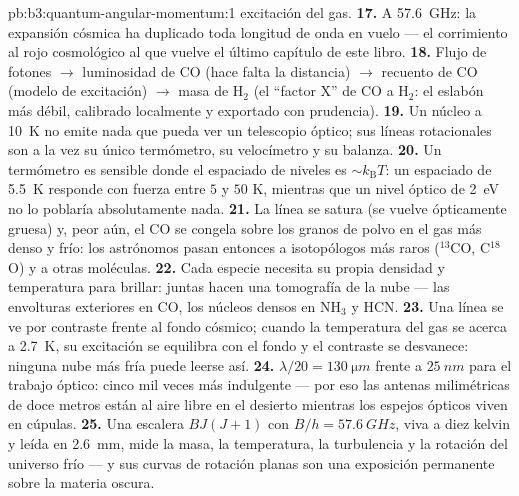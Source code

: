 \begin{solution}{pb:b3:quantum-angular-momentum:1}
excitación del gas.
\textbf{17.} A \qty{57.6}{GHz}: la expansión cósmica ha duplicado toda
longitud de onda en vuelo --- el corrimiento al rojo cosmológico al que
vuelve el último capítulo de este libro.
\textbf{18.} Flujo de fotones $\to$ luminosidad de CO (hace falta la
distancia) $\to$ recuento de CO (modelo de excitación) $\to$ masa de H$_2$
(el ``factor X'' de CO a H$_2$: el eslabón más débil, calibrado localmente
y exportado con prudencia).
\textbf{19.} Un núcleo a \qty{10}{K} no emite nada que pueda ver un
telescopio óptico; sus líneas rotacionales son a la vez su único
termómetro, su velocímetro y su balanza.
\textbf{20.} Un termómetro es sensible donde el espaciado de niveles es $\sim
k_{\text{B}}T$: un espaciado de \qty{5.5}{K} responde con fuerza
entre $5$ y $50$ K, mientras que un nivel óptico de \qty{2}{eV} no lo
poblaría absolutamente nada.
\textbf{21.} La línea se satura (se vuelve ópticamente gruesa) y, peor aún,
el CO se congela sobre los granos de polvo en el gas más denso y frío: los
astrónomos pasan entonces a isotopólogos más raros ($^{13}$CO, C$^{18}$O)
y a otras moléculas.
\textbf{22.} Cada especie necesita su propia densidad y temperatura para
brillar: juntas hacen una tomografía de la nube --- las envolturas
exteriores en CO, los núcleos densos en NH$_3$ y HCN.
\textbf{23.} Una línea se ve por contraste frente al fondo cósmico; cuando
la temperatura del gas se acerca a \qty{2.7}{K}, su excitación se equilibra
con el fondo y el contraste se desvanece: ninguna nube más fría puede leerse
así.
\textbf{24.} $\lambda/20 = \qty{130}{\micro m}$ frente a
$\qty{25}{nm}$ para el trabajo óptico: cinco mil veces más
indulgente --- por eso las antenas milimétricas de doce metros están al aire
libre en el desierto mientras los espejos ópticos viven en cúpulas.
\textbf{25.} Una escalera $BJ(J+1)$ con $B/h = \qty{57.6}{GHz}$, viva a
diez kelvin y leída en \qty{2.6}{mm}, mide la masa, la
temperatura, la turbulencia y la rotación del universo frío --- y sus
curvas de rotación planas son una exposición permanente sobre la materia
oscura.
\end{solution}
